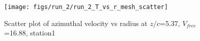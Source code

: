 \begin{figure}[H]
\centering
\texttt{[image: figs/run\_2/run\_2\_T\_vs\_r\_mesh\_scatter]}
\caption{Scatter plot of azimuthal velocity vs radius at $z/c$=5.37, $V_{free}$=16.88, station1}
\label{fig:run_2_T_vs_r_mesh_scatter}
\end{figure}


